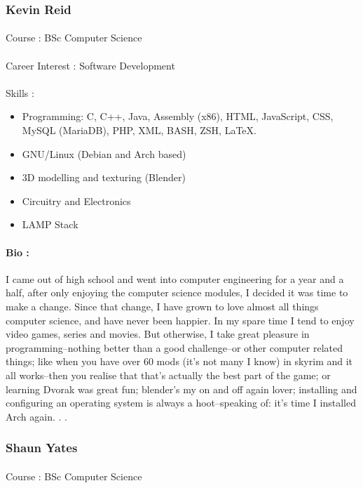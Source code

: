 \documentclass[11pt]{article}
\begin{document}
\subsubsection{Kevin Reid}
\paragraph{}Course : BSc Computer Science
\paragraph{}Career Interest : Software Development
\paragraph{}Skills : 
\begin{itemize}
\item Programming: C, C++, Java, Assembly (x86), HTML, JavaScript, CSS, MySQL (MariaDB), PHP, XML, BASH, ZSH, LaTeX.
\item GNU/Linux (Debian and Arch based)
\item 3D modelling and texturing (Blender)
\item Circuitry and Electronics
\item LAMP Stack
\end{itemize}
\paragraph{Bio :} I came out of high school and went into computer engineering for a year and a half, after only enjoying the computer science modules, I decided it was time to make a change. Since that change, I have grown to love almost all things computer science, and have never been happier.
In my spare time I tend to enjoy video games, series and movies. But otherwise, I take great pleasure in programming--nothing better than a good challenge--or other computer related things; like when you have over 60 mods (it's not many I know) in skyrim and it all works--then you realise that that's actually the best part of the game; or learning Dvorak was great fun; blender's my on and off again lover; installing and configuring an operating system is always a hoot--speaking of: it's time I installed Arch again. . .


\subsubsection{Shaun Yates}
\paragraph{}Course : BSc Computer Science
\end{document}
